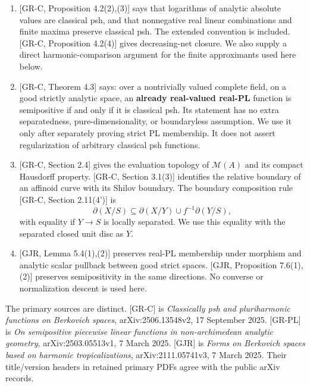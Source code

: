 \documentclass[
  11pt,
]{article}
\providecommand{\tightlist}{%
  \setlength{\itemsep}{0pt}\setlength{\parskip}{0pt}}
\begin{document}
\begin{enumerate}
\def\labelenumi{\arabic{enumi}.}
\tightlist
\item
  {[}GR-C, Proposition 4.2(2),(3){]} says that logarithms of analytic
  absolute values are classical psh, and that nonnegative real linear
  combinations and finite maxima preserve classical psh. The extended
  convention is included. {[}GR-C, Proposition 4.2(4){]} gives
  decreasing-net closure. We also supply a direct harmonic-comparison
  argument for the finite approximants used here below.
\item
  {[}GR-C, Theorem 4.3{]} says: over a nontrivially valued complete
  field, on a good strictly analytic space, an \textbf{already
  real-valued real-PL} function is semipositive if and only if it is
  classical psh. Its statement has no extra separatedness,
  pure-dimensionality, or boundaryless assumption. We use it only after
  separately proving strict PL membership. It does not assert
  regularization of arbitrary classical psh functions.
\item
  {[}GR-C, Section 2.4{]} gives the evaluation topology of
  \(\mathcal M(A)\) and its compact Hausdorff property. {[}GR-C, Section
  3.1(3){]} identifies the relative boundary of an affinoid curve with
  its Shilov boundary. The boundary composition rule {[}GR-C, Section
  2.11(4'){]} is
  \[\partial(X/S)\subseteq\partial(X/Y)\cup f^{-1}\partial(Y/S),\] with
  equality if \(Y\to S\) is locally separated. We use this equality with
  the separated closed unit disc as \(Y\).
\item
  {[}GJR, Lemma 5.4(1),(2){]} preserves real-PL membership under
  morphism and analytic scalar pullback between good strict spaces.
  {[}GJR, Proposition 7.6(1),(2){]} preserves semipositivity in the same
  directions. No converse or normalization descent is used here.
\end{enumerate}

The primary sources are distinct. {[}GR-C{]} is \emph{Classically psh
and pluriharmonic functions on Berkovich spaces}, arXiv:2506.13548v2, 17
September 2025. {[}GR-PL{]} is \emph{On semipositive piecewise linear
functions in non-archimedean analytic geometry}, arXiv:2503.05513v1, 7
March 2025. {[}GJR{]} is \emph{Forms on Berkovich spaces based on
harmonic tropicalizations}, arXiv:2111.05741v3, 7 March 2025. Their
title/version headers in retained primary PDFs agree with the public
arXiv records.
\end{document}
